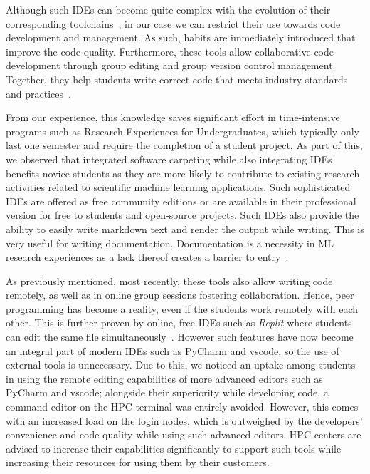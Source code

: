 \documentclass[utf8]{FrontiersinVancouver} %
\begin{document}
Although such IDEs can become quite complex with the evolution of their corresponding toolchains~\cite{fincher_robins_2019}, in our case we can restrict their use towards code development and management.
As such, habits are immediately introduced that improve the code quality. Furthermore, these tools allow 
collaborative code development through group editing and group version control management.
Together, they help students write correct code that meets industry standards and practices~\cite{tan_chen}.

From our experience, this knowledge saves significant effort in time-intensive programs such as Research Experiences for Undergraduates, which typically only last one semester and require the completion of a student project. As part of this, we observed that integrated software carpeting while also integrating IDEs benefits novice students as they are more likely to contribute to existing research activities related to scientific machine learning applications.
Such sophisticated IDEs are offered as free community editions or are available in their professional version for free to students and open-source projects.
Such IDEs also provide the ability to easily write markdown text and render the output while writing. This is very useful for writing documentation. Documentation is a necessity in ML research experiences as a lack thereof creates a barrier to entry~\cite{konigstorfer}.

As previously mentioned, most recently, these tools also allow writing code remotely, as well as in online group sessions fostering collaboration. Hence, peer programming has become a reality, even if the students work remotely with each other. This is further proven by online, free IDEs such as {\em Replit} where students can edit the same file simultaneously~\cite{Kovtaniuk2022}. However such features have now become an integral part of modern IDEs such as PyCharm and vscode, so the use of external tools is unnecessary. Due to this, 
we noticed an uptake among students in using the remote editing capabilities of more advanced editors such as PyCharm and vscode; alongside their superiority while developing code, a command editor on the HPC terminal was entirely avoided. However, this comes with an increased load on the login nodes, which is outweighed by the developers' convenience and code quality while using such advanced editors. HPC centers are advised to increase their capabilities significantly to support such tools while increasing their resources for using them by their customers.
\end{document}
